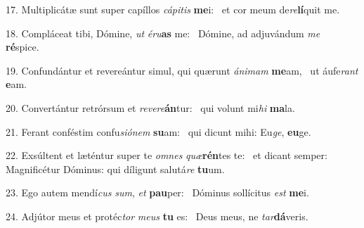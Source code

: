 17. Multiplicátæ sunt super capíllos \textit{cá}\textit{pi}\textit{tis} \textbf{me}i: \ast\  et cor meum de\textit{re}\textbf{lí}quit me.\

18. Compláceat tibi, Dómine, \textit{ut} \textit{é}\textit{ru}\textbf{as} me: \ast\  Dómine, ad adjuvándum \textit{me} \textbf{ré}spice.\

19. Confundántur et revereántur simul, qui quærunt \textit{á}\textit{ni}\textit{mam} \textbf{me}am, \ast\  ut áufe\textit{rant} \textbf{e}am.\

20. Convertántur retrórsum et \textit{re}\textit{ve}\textit{re}\textbf{án}tur: \ast\  qui volunt mi\textit{hi} \textbf{ma}la.\

21. Ferant conféstim confu\textit{si}\textit{ó}\textit{nem} \textbf{su}am: \ast\  qui dicunt mihi: Eu\textit{ge}, \textbf{eu}ge.\

22. Exsúltent et læténtur super te \textit{om}\textit{nes} \textit{quæ}\textbf{rén}tes te: \ast\  et dicant semper: Magnificétur Dóminus: qui díligunt salutá\textit{re} \textbf{tu}um.\

23. Ego autem mendí\textit{cus} \textit{sum}, \textit{et} \textbf{pau}per: \ast\  Dóminus sollícitus \textit{est} \textbf{me}i.\

24. Adjútor meus et protéc\textit{tor} \textit{me}\textit{us} \textbf{tu} es: \ast\  Deus meus, ne \textit{tar}\textbf{dá}veris.\

